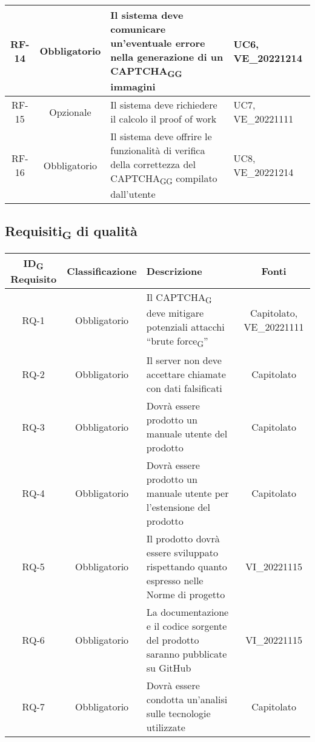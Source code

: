 \begin{tabularx}{\textwidth}{| c | c | X | X |}
 \hline
 RF-14 & Obbligatorio & Il sistema deve comunicare un'eventuale errore nella generazione di un CAPTCHA\textsubscript{G}\textsubscript{G} immagini & UC6, VE\_20221214\\
 \hline
 RF-15 & Opzionale & Il sistema deve richiedere il calcolo il proof of work & UC7, VE\_20221111\\
 \hline
 RF-16 & Obbligatorio & Il sistema deve offrire le funzionalità di verifica della correttezza del CAPTCHA\textsubscript{G}\textsubscript{G} compilato dall'utente & UC8, VE\_20221214\\
 \hline
\end{tabularx}

\subsection{Requisiti\textsubscript{G} di qualità}
\renewcommand\tabularxcolumn[1]{>{\Centering}m{#1}}
\begin{tabularx}{\textwidth}{| c | c | X | c |} 
 \hline
 \textbf{ID\textsubscript{G} Requisito} & \textbf{Classificazione} & \textbf{Descrizione} & \textbf{Fonti} \\
 \hline
 RQ-1 & Obbligatorio & Il CAPTCHA\textsubscript{G} deve mitigare potenziali attacchi “brute force\textsubscript{G}” & Capitolato, VE\_20221111\\
 \hline
  RQ-2 & Obbligatorio & Il server non deve accettare chiamate con dati falsificati & Capitolato\\
 \hline
 RQ-3 & Obbligatorio & Dovrà essere prodotto un manuale utente del prodotto & Capitolato\\
 \hline
 RQ-4 & Obbligatorio & Dovrà essere prodotto un manuale utente per l'estensione del prodotto &  Capitolato\\
 \hline
 RQ-5 & Obbligatorio & Il prodotto dovrà essere sviluppato rispettando quanto espresso nelle Norme di progetto & VI\_20221115\\
 \hline
 RQ-6 & Obbligatorio & La documentazione e il codice sorgente del prodotto saranno pubblicate su GitHub & VI\_20221115\\
 \hline
 RQ-7 & Obbligatorio & Dovrà essere condotta un'analisi sulle tecnologie utilizzate & Capitolato\\
 \hline
\end{tabularx}


